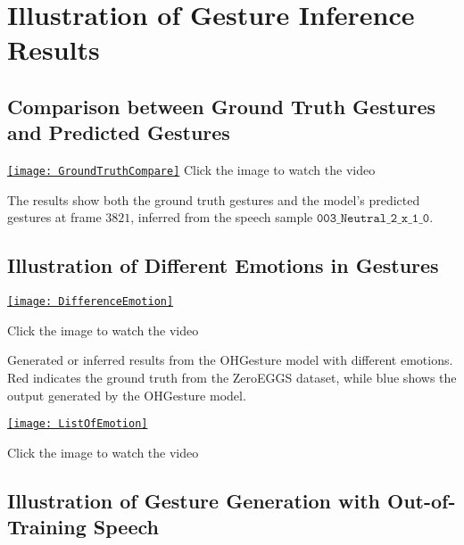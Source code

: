 \chapter{Illustration of Gesture Inference Results}
\label{Appendix3}

\section{Comparison between Ground Truth Gestures and Predicted Gestures}

\begin{center}
\centering
\href{https://youtu.be/22lNm2tvmrk}{%
\texttt{[image: GroundTruthCompare]}}
{\tiny Click the image to watch the video}
\end{center}

The results show both the ground truth gestures and the model's predicted gestures at frame $3821$, inferred from the speech sample $\texttt{003\_Neutral\_2\_x\_1\_0}$.

\section{Illustration of Different Emotions in Gestures}

{
	\begin{center}
		\centering
		\href{https://youtu.be/KUlBZXLtYJ4}{%
			\texttt{[image: DifferenceEmotion]}}
		
		{\tiny Click the image to watch the video}
	\end{center}
}

Generated or inferred results from the OHGesture model with different emotions. Red indicates the ground truth from the ZeroEGGS dataset, while blue shows the output generated by the OHGesture model.

{
	\begin{center}
		\centering
		\href{https://youtu.be/eZghfNGmZn8}{%
			\texttt{[image: ListOfEmotion]}}
		
		{\tiny Click the image to watch the video}
	\end{center}
}

\section{Illustration of Gesture Generation with Out-of-Training Speech}

